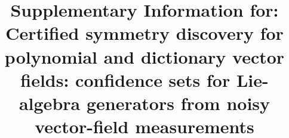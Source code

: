 \documentclass[pdflatex,sn-nature]{sn-jnl}
\begin{document}
\title[Certified symmetry discovery: Supplementary Information]{Supplementary
Information for: Certified symmetry discovery for polynomial and dictionary
vector fields: confidence sets for Lie-algebra generators from noisy
vector-field measurements}

\author*[1]{ }


\maketitle

\raggedright


\end{document}
